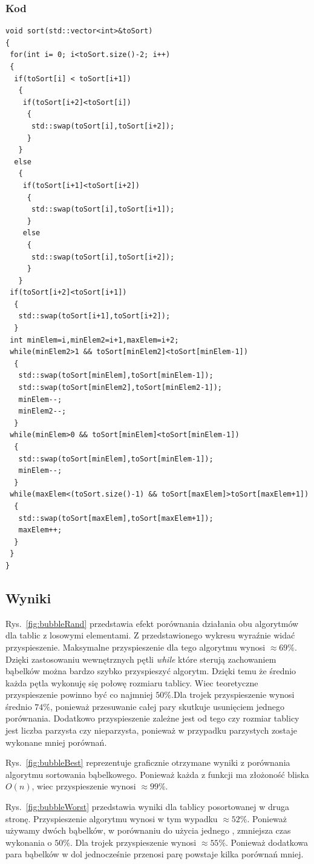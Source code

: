 \subsubsection{Kod}
\begin{lstlisting}[caption={Sortowanie bąbelkowe dla trzech elementow},label={lst:babelek}]
void sort(std::vector<int>&toSort)
{
 for(int i= 0; i<toSort.size()-2; i++)
 {
  if(toSort[i] < toSort[i+1])
   {
    if(toSort[i+2]<toSort[i])
     {
      std::swap(toSort[i],toSort[i+2]);
     }
   }
  else
   {
    if(toSort[i+1]<toSort[i+2])
     {
      std::swap(toSort[i],toSort[i+1]);
     }
    else
     {
      std::swap(toSort[i],toSort[i+2]);
     }
   }
 if(toSort[i+2]<toSort[i+1])
  {
   std::swap(toSort[i+1],toSort[i+2]);
  }
 int minElem=i,minElem2=i+1,maxElem=i+2;
 while(minElem2>1 && toSort[minElem2]<toSort[minElem-1])
  {
   std::swap(toSort[minElem],toSort[minElem-1]);
   std::swap(toSort[minElem2],toSort[minElem2-1]);
   minElem--;
   minElem2--;
  }
 while(minElem>0 && toSort[minElem]<toSort[minElem-1])
  {
   std::swap(toSort[minElem],toSort[minElem-1]);
   minElem--;
  }
 while(maxElem<(toSort.size()-1) && toSort[maxElem]>toSort[maxElem+1])
  {
   std::swap(toSort[maxElem],toSort[maxElem+1]);
   maxElem++;
  }
 }
}
\end{lstlisting}








\subsection{Wyniki}
\par Rys.~\ref{fig:bubbleRand} przedstawia efekt porównania działania obu algorytmów dla tablic z losowymi elementami. Z przedstawionego wykresu wyraźnie widać przyspieszenie. Maksymalne przyspieszenie dla tego algorytmu wynosi $\approx 69\%$. Dzięki zastosowaniu wewnętrznych pętli \textit{while} które sterują zachowaniem bąbelków można bardzo szybko przyspieszyć algorytm. Dzięki temu że średnio każda pętla wykonuję się połowę rozmiaru tablicy. Wiec teoretyczne przyspieszenie powinno być co najmniej $50 \% $.Dla trojek przyspieszenie wynosi średnio $74\%$, ponieważ przesuwanie całej pary skutkuje usunięciem jednego porównania. Dodatkowo przyspieszenie zależne jest od tego czy rozmiar tablicy jest liczba parzysta czy nieparzysta, ponieważ w przypadku parzystych zostaje wykonane mniej porównań.
\par Rys.~\ref{fig:bubbleBest} reprezentuje graficznie otrzymane wyniki z porównania algorytmu sortowania bąbelkowego. Ponieważ każda z funkcji ma złożoność bliska $O(n)$, wiec przyspieszenie wynosi $\approx 99\%$.
\par Rys.~\ref{fig:bubbleWorst} przedstawia wyniki dla tablicy posortowanej w druga stronę. Przyspieszenie algorytmu wynosi w tym wypadku $\approx 52\%$. Ponieważ używamy dwóch bąbelków, w porównaniu do użycia jednego , zmniejsza czas wykonania o $50\%$. Dla trojek przyspieszenie wynosi $\approx 55\%$. Ponieważ dodatkowa para bąbelków w dol jednocześnie przenosi parę powstaje kilka porównań mniej.


